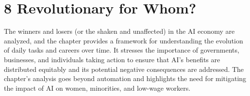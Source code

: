 \section*{8 Revolutionary for Whom?}

The winners and losers (or the shaken and unaffected) in the AI economy are analyzed, and the chapter provides a framework for understanding the evolution of daily tasks and careers over time. It stresses the importance of governments, businesses, and individuals taking action to ensure that AI's benefits are distributed equitably and its potential negative consequences are addressed. The chapter's analysis goes beyond automation and highlights the need for mitigating the impact of AI on women, minorities, and low-wage workers.
